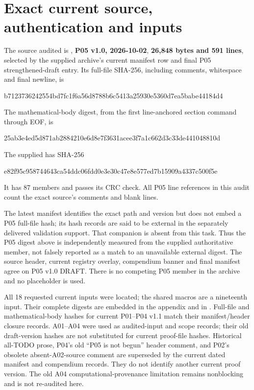 \documentclass[11pt]{article}
\newcommand{\sha}[2]{\par{\small\ttfamily #1\allowbreak #2}\par}
\begin{document}
\section{Exact current source, authentication and inputs}
The source audited is
, \textbf{P05 v1.0, 2026-10-02},
\textbf{26,848 bytes and 591 lines}, selected by the supplied archive's
current manifest row and final P05 strengthened-draft entry. Its full-file
SHA-256, including comments, whitespace and final newline, is
\sha{b7123736242554bd7fc1f6a56d8788b6c54}{13a25930e5360d7ea5babe44184d4}
The mathematical-body digest, from the first line-anchored section command
through EOF, is
\sha{25ab3e4ed5d871ab2884210e6d8e7f3631a}{cee3f7a1c662d3c33de441048810d}
The supplied  has SHA-256
\sha{e82f95c958744643ca54ddc06fdd0e3e30c}{47e8e577ed7b15909a4337c500f5e}
It has 87 members and passes its CRC check. All P05 line references in
this audit count the exact source's comments and blank lines.

The latest manifest identifies the exact path and version but does not
embed a P05 full-file hash; its hash records are said to be external in
the separately delivered validation support. That companion is absent
from this task. Thus the P05 digest above is independently measured from
the supplied authoritative member, not falsely reported as a match to
an unavailable external digest. The source header, current registry
overlay, compendium banner and final manifest agree on P05 v1.0 DRAFT.
There is no competing P05 member in the archive and no placeholder is used.

All 18 requested current inputs were located; the shared macros are a
nineteenth input. Their complete digests are embedded in the appendix and
in . Full-file and mathematical-body
hashes for current P01--P04 v1.1 match their manifest/header closure
records. A01--A04 were used as audited-input and scope records; their old
draft-version hashes are not substituted for current proof-file hashes.
Historical all-TODO prose, P04's old ``P05 is not begun'' header comment,
and P02's obsolete absent-A02-source comment are superseded by the current
dated manifest and compendium records. They do not identify another current
proof version. The old A04 computational-provenance limitation remains
nonblocking and is not re-audited here.
\end{document}
